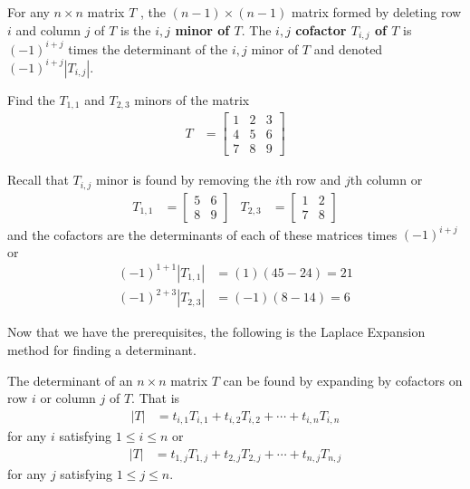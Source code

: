 \begin{definition}
For any $n\times n$ matrix $T$ , the $(n - 1)\times(n - 1)$ matrix formed by deleting row $i$ and column $j$ of $T$ is the \textbf{$i,j$ minor of $T$}. The \textbf{$i,j$ cofactor $T_{i,j}$ of $T$} is $(-1)^{i+j}$ times the determinant of the $i, j$ minor of $T$ and denoted $(-1)^{i+j} |T_{i,j}|$.
\end{definition}

\begin{example}
Find the $T_{1,1}$ and $T_{2,3}$ minors of the matrix
%
\begin{align*}
T & = \begin{bmatrix}
1 & 2 & 3 \\
4 & 5 & 6 \\
7 & 8 & 9 
\end{bmatrix}
\end{align*}

\solution 

Recall that $T_{i,j}$ minor is found by removing the $i$th row and $j$th column or
%
\begin{align*}
T_{1,1} & = \begin{bmatrix}
5 & 6 \\
8 & 9 
\end{bmatrix} & T_{2,3} & = \begin{bmatrix}
1 & 2 \\
7 & 8 
\end{bmatrix}
\end{align*}
and the cofactors are the determinants of each of these matrices times $(-1)^{i+j}$ or 
%
\begin{align*}
(-1)^{1+1} |T_{1,1}| &= (1) (45-24) = 21 \\
(-1)^{2+3} |T_{2,3}| & = (-1) (8-14) = 6 
\end{align*}
\end{example}

Now that we have the prerequisites, the following is the Laplace Expansion method for finding a determinant. 

\begin{theorem}
The determinant of an $n \times n$ matrix $T$ can be found by expanding by cofactors on row $i$ or column $j$ of $T$.  That is
%
\begin{align*}
|T| & = t_{i,1} T_{i,1} + t_{i,2} T_{i,2} + \cdots + t_{i,n} T_{i,n} 
\end{align*}
for any $i$ satisfying $1 \leq i \leq n$ or
\begin{align*}
|T| & = t_{1,j} T_{1,j} + t_{2,j} T_{2,j} + \cdots + t_{n,j} T_{n,j} 
\end{align*}
for any $j$ satisfying $1 \leq j \leq n$.
\end{theorem}

